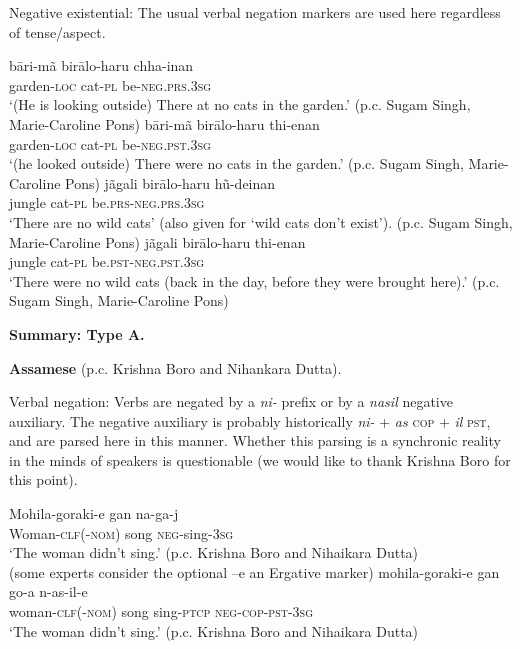 \documentclass[output=paper]{langsci/langscibook}
\begin{document}
\begin{unindented}
Negative existential: The usual verbal negation markers are used here regardless of tense/aspect.
%
\begin{exe}\ex \gll bāri-mã birālo-haru  chha-inan \\
garden-\textsc{loc} cat-\textsc{pl} be-\textsc{neg.prs.3sg} \\
    \glt `(He is looking outside) There at no cats in the garden.' (p.c. Sugam Singh, Marie-Caroline Pons)
\ex \gll bāri-mã birālo-haru  thi-enan \\
garden-\textsc{loc} cat-\textsc{pl} be-\textsc{neg.pst.3sg} \\
    \glt `(he looked outside) There were no cats in the garden.' (p.c. Sugam Singh, Marie-Caroline Pons)
\ex \gll jãgali birālo-haru hũ-deinan \\
jungle cat-\textsc{pl} be.\textsc{prs-neg.prs.3sg} \\
    \glt `There are no wild cats' (also given for `wild cats don't exist’). (p.c. Sugam Singh, Marie-Caroline Pons)
\ex \gll jãgali birālo-haru thi-enan \\
jungle cat-\textsc{pl} be.\textsc{pst-neg.pst.3sg} \\
    \glt `There were no wild cats (back in the day, before they were brought here).' (p.c. Sugam Singh, Marie-Caroline Pons)
    \end{exe} 

\textbf{Summary: Type A.}

\textbf{Assamese} (p.c. Krishna Boro and Nihankara Dutta).

Verbal negation: Verbs are negated by a \textit{ni-} prefix or by a
\textit{nasil} negative auxiliary. The negative auxiliary is probably
historically \textit{ni-} + \textit{as} \textsc{cop} + \textit{il}
\textsc{pst}, and are parsed here in this manner. Whether this parsing is a synchronic reality in the minds of speakers is questionable (we would like to thank Krishna Boro for this point).
%
\begin{exe}\ex \gll Mohila-goraki{\op}-e{\cp} gan na-ga-j \\
Woman-\textsc{clf(-nom)}  song \textsc{neg}-sing-\textsc{3sg} \\
    \glt `The woman didn't sing.' (p.c. Krishna Boro and Nihaikara Dutta)
\\
(some experts consider the optional –e an Ergative marker)
\ex \gll mohila-goraki{\op}-e{\cp} gan  go-a n-as-il-e \\
woman-\textsc{clf}(-\textsc{nom}) song sing-\textsc{ptcp} \textsc{neg-cop-pst-3sg} \\
    \glt `The woman didn't sing.' (p.c. Krishna Boro and Nihaikara Dutta)
    \end{exe}


\end{unindented}
\end{document}
